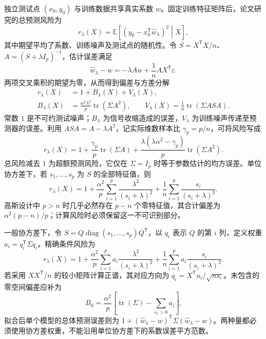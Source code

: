 \documentclass[UTF8,fontset=fandol,a4paper,zihao=-4]{ctexart}
\DeclareMathOperator{\tr}{tr}
\newcommand{\E}{\mathbb{E}}
\newcommand{\whw}{\widehat w}
\begin{document}
独立测试点 $(x_0,y_0)$ 与训练数据共享真实系数 $w$。固定训练特征矩阵后，论文研究的总预测风险为
\begin{equation}\label{eq:conditional}
 r_\lambda(X)=\E\!\left[(y_0-x_0^{\mathsf T}\whw_\lambda)^2\middle|X\right],
\end{equation}
其中期望平均了系数、训练噪声及测试点的随机性。令 $S=X^{\mathsf T}X/n$、$A=(S+\lambda I_p)^{-1}$，估计误差满足
\begin{equation}\label{eq:esterror}
 \whw_\lambda-w=-\lambda Aw+\frac{1}{n}AX^{\mathsf T}\varepsilon.
\end{equation}
两项交叉乘积的期望为零，从而得到偏差与方差分解
\begin{align}
 r_\lambda(X)&=1+B_\lambda(X)+V_\lambda(X),\label{eq:decompose}\\
 B_\lambda(X)&=\frac{\alpha^2\lambda^2}{p}\tr(\Sigma A^2),\qquad
 V_\lambda(X)=\frac{1}{n}\tr(\Sigma ASA).
\end{align}
常数 $1$ 是不可约测试噪声；$B_\lambda$ 为信号收缩造成的误差，$V_\lambda$ 为训练噪声传递至预测器的误差。利用 $ASA=A-\lambda A^2$，记实际维数样本比 $\gamma_p=p/n$，可将风险写成
\begin{equation}\label{eq:trace}
 r_\lambda(X)=1+\frac{\gamma_p}{p}\tr(\Sigma A)
 +\frac{\lambda(\lambda\alpha^2-\gamma_p)}{p}\tr(\Sigma A^2).
\end{equation}
总风险减去 $1$ 为超额预测风险，它仅在 $\Sigma=I_p$ 时等于参数估计的均方误差。单位协方差下，若 $s_1,\ldots,s_p$ 为 $S$ 的全部特征值，则
\begin{equation}\label{eq:eigenrisk}
 r_\lambda(X)=1+\frac{\alpha^2}{p}\sum_{i=1}^{p}\frac{\lambda^2}{(s_i+\lambda)^2}
 +\frac{1}{n}\sum_{i=1}^{p}\frac{s_i}{(s_i+\lambda)^2}.
\end{equation}
高斯设计中 $p>n$ 时几乎必然存在 $p-n$ 个零特征值，其合计偏差为 $\alpha^2(p-n)/p$；计算风险时必须保留这一不可识别部分。

一般协方差下，令 $S=Q\operatorname{diag}(s_1,\ldots,s_p)Q^{\mathsf T}$，以 $q_i$ 表示 $Q$ 的第 $i$ 列，定义权重 $a_i=q_i^{\mathsf T}\Sigma q_i$。精确条件风险为
\begin{equation}\label{eq:weightedrisk}
 r_\lambda(X)=1+\frac{\alpha^2}{p}\sum_{i=1}^{p}a_i\frac{\lambda^2}{(s_i+\lambda)^2}
 +\frac{1}{n}\sum_{i=1}^{p}a_i\frac{s_i}{(s_i+\lambda)^2}.
\end{equation}
若采用 $XX^{\mathsf T}/n$ 的较小矩阵计算正谱，其对应方向为 $q_i=X^{\mathsf T}u_i/\sqrt{ns_i}$。未包含的零空间偏差应补为
\begin{equation}\label{eq:weightednull}
 B_0=\frac{\alpha^2}{p}\left[\tr(\Sigma)-\sum_{s_i>0}a_i\right].
\end{equation}
拟合后单个模型的总体预测误差则为 $1+(\whw_\lambda-w)^{\mathsf T}\Sigma(\whw_\lambda-w)$。两种量都必须使用协方差权重，不能沿用单位协方差下的系数误差平方范数。
\end{document}
